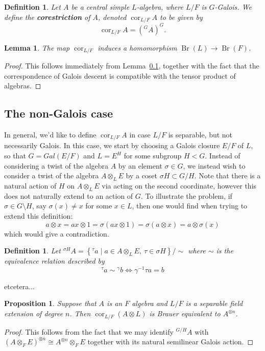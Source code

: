 \documentclass[12pt]{report}
\theoremstyle{plain}
\newtheorem{defn}[thm]{Definition}
\newtheorem{lem}[thm]{Lemma}
\newtheorem{prop}[thm]{Proposition}
\newcommand{\oper}[1]{\operatorname{#1}}
\newcommand{\cores}{\oper{cor}}
\newcommand{\Br}{\oper{Br}}
\newcommand{\Xb}[1]{\textbf{#1}\index{#1}}
\newcommand{\todo}[1]{\textcolor{todo}{#1}}
\begin{document}
\begin{defn}
Let $A$ be a central simple $L$-algebra, where $L/F$ is $G$-Galois. We
define the \Xb{corestriction} of $A$, denoted $\cores_{L/F} A$ to be given by 
\[\cores_{L/F} A = \left({}^G A\right)^G.\]
\end{defn}

\begin{lem}
The map $\cores_{L/F}$ induces a homomorphism $\Br(L) \to \Br(F)$.
\end{lem}
\begin{proof}
This follows immediately from Lemma~\ref{}, together with the fact that the
correspondence of Galois descent is compatible with the tensor product of
algebras.
\end{proof}

\subsection{The non-Galois case}

In general, we'd like to define $\cores_{L/F} A$ in case $L/F$ is separable,
but not necessarily Galois. In this case, we start by choosing a Galois
closure $E/F$ of $L$, so that $G = Gal(E/F)$ and $L = E^H$ for some
subgroup $H < G$. Instead of considering a twist of the algebra $A$ by an
element $\sigma \in G$, we instead wish to consider a twist of the algebra
$A \otimes_L E$ by a coset $\sigma H \subset G/H$. Note that there is a
natural action of $H$ on $A \otimes_L E$ via acting on the second
coordinate, however this does not naturally extend to an action of $G$. To
illustrate the problem, if $\sigma \in G \setminus H$, say $\sigma(x) \neq
x$ for some $x \in L$, then one would find when trying to extend this
definition:
\[ a \otimes x = ax \otimes 1 = \sigma(a x \otimes 1) = \sigma (a \otimes
x) = a \otimes \sigma(x) \]
which would give a contradiction.

\begin{defn}
Let $^{\sigma H} A = \left\{ ^\tau a \mid a \in A \otimes_L E, \ \tau \in \sigma H \right\}/\sim$
where $\sim$ is the equivalence relation described by
\[ {}^\tau a \sim {}^\gamma b \iff \gamma^{-1} \tau a = b \]
\end{defn}

\todo{etcetera...}

\begin{prop}
Suppose that $A$ is an $F$ algebra and $L/F$ is a separable field extension
of degree $n$. Then $\cores_{L/F}(A \otimes L)$ is Brauer equivalent to
$A^{\otimes n}$.
\end{prop}
\begin{proof}
This follows from the fact that we may identify $^{G/H} A$ with $(A
\otimes_F E)^{\otimes n} \cong A^{\otimes n} \otimes_{F} E$ together with
its natural semilinear Galois action.
\end{proof}
\end{document}
